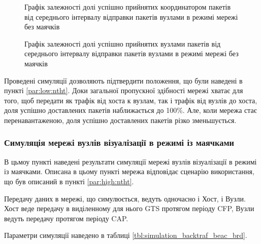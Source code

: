 \documentclass[a4paper,ukrainian,utf8,nocolumnsxix,floatsection,equationsection]{eskdtext}
\renewcommand\paragraph{\subsubsection}
\begin{document}
\begin{figure}[h]
	\centering
	\caption{\label{fig:result_test_backtraf_nobeac_brd_succ_rate}Графік залежності долі успішно прийнятих координатором пакетів від середнього інтервалу відправки пакетів вузлами в режимі мережі без маячків}
\end{figure}

\begin{figure}[h]
	\centering
	\caption{\label{fig:result_test_backtraf_nobeac_brd_deliv}Графік залежності долі успішно прийнятих вузлами пакетів від середнього інтервалу відправки пакетів вузлами в режимі мережі без маячків}
\end{figure}


Проведені симуляції дозволяють підтвердити положення, що були наведені в пункті \ref{par:low:ntht}. Доки загальної пропускної здібності мережі хватає для того, щоб передати як трафік від хоста к вузлам, так і трафік від вузлів до хоста, доля успішно доставлених пакетів наближається до 100\%. Але, коли мережа стає перенавантаженою, доля успішно доставлених пакетів різко зменьшується. 


\paragraph{Симуляція мережі вузлів візуалізації в режимі із маячками}
\label{par:simulation_backtraf_beac}

В цьмоу пункті наведені результати симуляції мережі вузлів візуалізації в режимі із маячками. Описана в цьому пункті мережа відповідає сценарію використання, що був описаний в пункті \ref{par:high:ntht}.

Передачу даних в мережі, що симулюється, ведуть одночасно і Хост, і Вузли. Хост веде передачу в виділенному для нього GTS протягом періоду CFP, Вузли ведуть передачу протягом періоду CAP. 

Параметри симуляції наведено в таблиці \ref{tbl:simulation_backtraf_beac_brd}.
\end{document}

